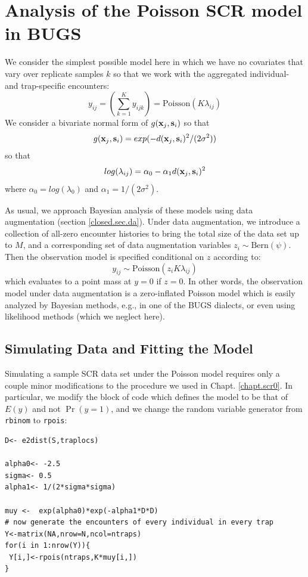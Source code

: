 \section{Analysis of the Poisson SCR model in BUGS}

We consider the simplest possible model here in which we have no
covariates that vary over replicate samples $k$ so that we work with
the aggregated individual- and trap-specific encounters:
\[
y_{ij} = (\sum_{k=1}^{K} y_{ijk}) =  \mbox{Poisson}(K  \lambda_{ij})
\]
We consider a bivariate normal form of $g({\bf x}_{j},{\bf s}_{i})$ so
that
\[
g({\bf x}_{j},{\bf s}_{i}) = exp( -d({\bf x}_{j}, {\bf
  s}_{i})^{2} /(2\sigma^{2}))
\]
so that 
\[
log( \lambda_{ij})  =\alpha_{0} - \alpha_{1} d({\bf x}_{j}, {\bf s}_{i})^2
\]
where $\alpha_{0} = log(\lambda_{0})$ and $\alpha_1 = 1/(2\sigma^2)$.


As usual, we approach Bayesian analysis of these
models using data augmentation (section \ref{closed.sec.da}).
Under data augmentation, we introduce a collection of all-zero encounter
histories to bring the total size of the data set up to $M$, and a corresponding
set of data augmentation variables $z_{i} \sim \mbox{Bern}(\psi)$. Then
the observation model is specified conditional on $z$ according to:
\[
y_{ij} \sim  \mbox{Poisson}(z_{i} K  \lambda_{ij})
\]
which evaluates to a point mass at $y=0$ if $z=0$.  In other words, the
observation model under data augmentation is a zero-inflated Poisson
model which is easily analyzed by Bayesian methods, e.g., in one of the BUGS
dialects, or even using likelihood methods (which we neglect here).


\subsection{Simulating Data and Fitting the Model}


Simulating a sample SCR data set under the Poisson model requires only
a couple minor modifications to the procedure we used in
Chapt. \ref{chapt.scr0}. In
particular, we modify the block of code which defines the model to be
that of $E(y)$ and not $\Pr(y=1)$, and we change the random variable
generator from \mbox{\tt rbinom} to \mbox{\tt rpois}:
{\small
\begin{verbatim}
D<- e2dist(S,traplocs)

alpha0<- -2.5
sigma<- 0.5
alpha1<- 1/(2*sigma*sigma)

muy <-  exp(alpha0)*exp(-alpha1*D*D)
# now generate the encounters of every individual in every trap
Y<-matrix(NA,nrow=N,ncol=ntraps)
for(i in 1:nrow(Y)){
 Y[i,]<-rpois(ntraps,K*muy[i,])
}
\end{verbatim}
}

